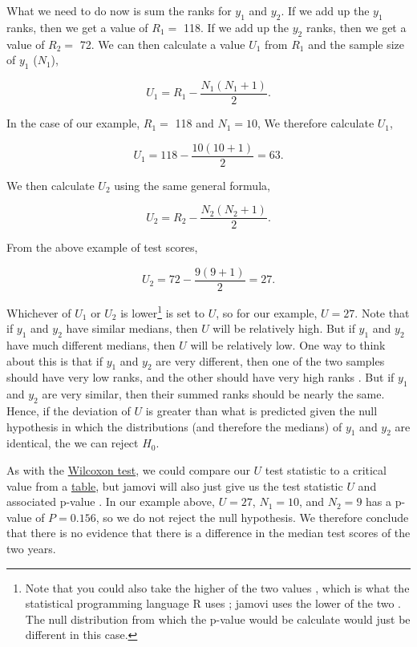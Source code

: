 \documentclass[
  openany]{krantz}
\begin{document}
What we need to do now is sum the ranks for \(y_{1}\) and \(y_{2}\).
If we add up the \(y_{1}\) ranks, then we get a value of \(R_{1}=\) 118.
If we add up the \(y_{2}\) ranks, then we get a value of \(R_{2}=\) 72.
We can then calculate a value \(U_{1}\) from \(R_{1}\) and the sample size of \(y_{1}\) (\(N_{1}\)),

\[U_{1} = R_{1} - \frac{N_{1}\left(N_{1} + 1 \right)}{2}.\]

In the case of our example, \(R_{1}=\) 118 and \(N_{1} = 10\),
We therefore calculate \(U_{1}\),

\[U_{1} = 118 - \frac{10\left(10 + 1 \right)}{2} = 63.\]

We then calculate \(U_{2}\) using the same general formula,

\[U_{2} = R_{2} - \frac{N_{2}\left(N_{2} + 1 \right)}{2}.\]

From the above example of test scores,

\[U_{2} = 72 - \frac{9\left(9 + 1 \right)}{2} = 27.\]

Whichever of \(U_{1}\) or \(U_{2}\) is lower\footnote{Note that you could also take the higher of the two values \citep{Sokal1995}, which is what the statistical programming language R uses \citep{Rproject}; jamovi uses the lower of the two \citep{Jamovi2022}. The null distribution from which the p-value would be calculate would just be different in this case.} is set to \(U\), so for our example, \(U = 27\).
Note that if \(y_{1}\) and \(y_{2}\) have similar medians, then \(U\) will be relatively high.
But if \(y_{1}\) and \(y_{2}\) have much different medians, then \(U\) will be relatively low.
One way to think about this is that if \(y_{1}\) and \(y_{2}\) are very different, then one of the two samples should have very low ranks, and the other should have very high ranks \citep{Sokal1995}.
But if \(y_{1}\) and \(y_{2}\) are very similar, then their summed ranks should be nearly the same.
Hence, if the deviation of \(U\) is greater than what is predicted given the null hypothesis in which the distributions (and therefore the medians) of \(y_{1}\) and \(y_{2}\) are identical, the we can reject \(H_{0}\).

As with the \protect\hyperlink{wilcoxon-test}{Wilcoxon test}, we could compare our \(U\) test statistic to a critical value from a \protect\hyperlink{mann-whitney-u-critical-values}{table}, but jamovi will also just give us the test statistic \(U\) and associated p-value \citep{Jamovi2022}.
In our example above, \(U = 27\), \(N_{1} = 10\), and \(N_{2} = 9\) has a p-value of \(P = 0.156\), so we do not reject the null hypothesis.
We therefore conclude that there is no evidence that there is a difference in the median test scores of the two years.
\end{document}
